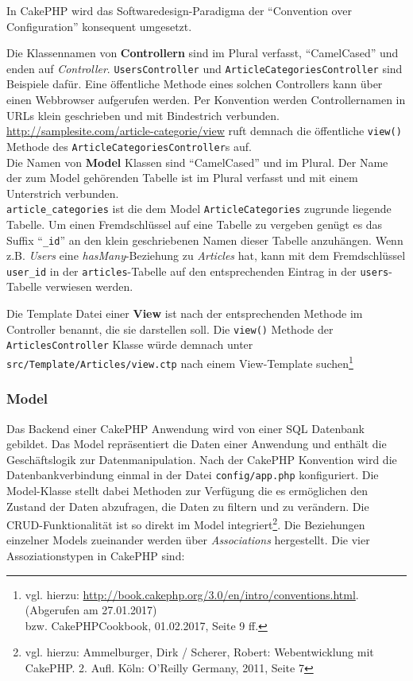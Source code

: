 	In CakePHP wird das Softwaredesign-Paradigma der \enquote{Convention over Configuration} konsequent umgesetzt.\newline %
	
	 Die Klassennamen von \textbf{Controllern} sind im Plural verfasst, \enquote{CamelCased} und enden auf \textit{Controller}. \texttt{UsersController} und \texttt{ArticleCategoriesController} sind Beispiele dafür. Eine öffentliche Methode eines solchen Controllers kann über einen Webbrowser aufgerufen werden. Per Konvention werden Controllernamen in URLs klein geschrieben und mit Bindestrich verbunden.
	\url{http://samplesite.com/article-categorie/view} ruft demnach die öffentliche \texttt{view()} Methode des \texttt{ArticleCategoriesController}s auf.\\
	\newline
	Die Namen von \textbf{Model} Klassen sind \enquote{CamelCased} und im Plural. Der Name der zum Model gehörenden Tabelle ist im Plural verfasst und mit einem Unterstrich verbunden.\\
	\texttt{article\_categories} ist die dem Model \texttt{ArticleCategories} zugrunde liegende Tabelle. Um einen Fremdschlüssel auf eine Tabelle zu vergeben genügt es das Suffix \enquote{\texttt{\_id}} an den klein geschriebenen Namen dieser Tabelle anzuhängen. Wenn z.B. \textit{Users} eine \textit{hasMany}-Beziehung zu \textit{Articles} hat, kann mit dem Fremdschlüssel \texttt{user\_id} in der \texttt{articles}-Tabelle auf den entsprechenden Eintrag in der \texttt{users}-Tabelle verwiesen werden. \newline
	
	Die Template Datei einer \textbf{View} ist nach der entsprechenden Methode im Controller benannt, die sie darstellen soll. Die \texttt{view()} Methode der \texttt{ArticlesController} Klasse würde demnach unter \texttt{src/Template/Articles/view.ctp} nach einem View-Template suchen\footnote{vgl. hierzu: \url{http://book.cakephp.org/3.0/en/intro/conventions.html}.(Abgerufen am 27.01.2017) \\bzw. CakePHPCookbook, 01.02.2017, Seite 9 ff. } 
	
	\subsubsection{Model}
	
	Das Backend einer CakePHP Anwendung wird von einer SQL Datenbank gebildet. Das Model repräsentiert die Daten einer Anwendung und enthält die Geschäftslogik zur Datenmanipulation. Nach der CakePHP Konvention wird die Datenbankverbindung einmal in der Datei \texttt{config/app.php} konfiguriert. Die Model-Klasse stellt dabei Methoden zur Verfügung die es ermöglichen den Zustand der Daten abzufragen, die Daten zu filtern und zu verändern. Die CRUD-Funktionalität ist so direkt im Model integriert\footnote{vgl. hierzu:  Ammelburger, Dirk / Scherer, Robert: Webentwicklung mit CakePHP. 2. Aufl. Köln: O'Reilly Germany, 2011, Seite 7}. 
	Die Beziehungen einzelner Models zueinander werden über \textit{Associations} hergestellt. Die vier Assoziationstypen in CakePHP sind:\\

